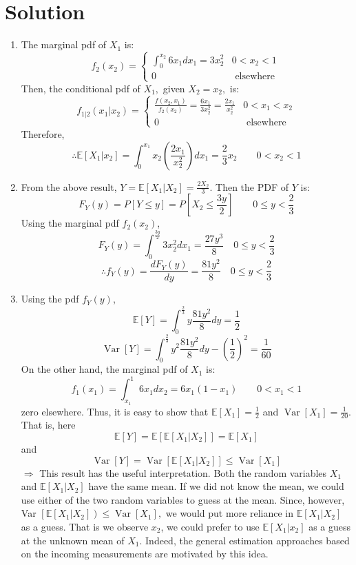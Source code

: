 \documentclass[10pt,a4paper,oneside]{article}
\begin{document}
\section* {Solution} 
\begin{enumerate}
\item The marginal pdf of $X_{1}$ is:
\[
f_{2}\left(x_{2}\right)=\left\{\begin{array}{ll}{\int_{0}^{x_{2}} 6 x_{1} d x_{1}=3 x_{2}^{2}} & {0<x_{2}<1} \\ {0} & {\text { elsewhere }}\end{array}\right.
\]
Then, the conditional pdf of $X_{1},$ given $X_{2}=x_{2},$ is:
\[
f_{1 | 2}\left(x_{1} | x_{2}\right)=\left\{\begin{array}{cc}{\frac{f\left(x_{2}, x_{1}\right)}{f_{2}\left(x_{2}\right)}=\frac{6 x_{1}}{3 x_{2}^{2}}=\frac{2 x_{1}}{x_{2}^{2}}} & {0<x_{1}<x_{2}} \\ {0} & {\text { elsewhere }}\end{array}\right.
\]
Therefore,
\[
\therefore \mathbb{E}\left[X_{1} | x_{2}\right]=\int_{0}^{x_{1}} x_{2}\left(\frac{2 x_{1}}{x_{2}^{2}}\right) d x_{1}=\frac{2}{3} x_{2} \qquad 0<x_{2}<1
\]
\item From the above result, $Y=\mathbb{E}\left[X_{1} | X_{2}\right]=\frac{2 X_{2}}{3} .$ Then the PDF of $Y$ is:
\[
F_{Y}(y)=P[Y \leq y]=P\left[X_{2} \leq \frac{3 y}{2}\right] \qquad 0 \leq y<\frac{2}{3}
\]
Using the marginal pdf $f_{2}\left(x_{2}\right)$,
\[
F_{Y}(y)=\int_{0}^{\frac{3 y}{2}} 3 x_{2}^{2} d x_{1}=\frac{27 y^{3}}{8} \quad 0 \leq y<\frac{2}{3}
\]
\[
\therefore f_{Y}(y)=\frac{d F_{Y}(y)}{d y}=\frac{81 y^{2}}{8} \quad 0 \leq y<\frac{2}{3}
\]
\item Using the pdf $f_Y(y)$,
\[
\mathbb{E}[Y]=\int_{0}^{\frac{2}{3}} y \frac{81 y^{2}}{8} d y=\frac{1}{2}
\]
\[
\operatorname{Var}[Y]=\int_{0}^{\frac{2}{3}} y^{2} \frac{81 y^{2}}{8} d y-\left(\frac{1}{2}\right)^{2}=\frac{1}{60}
\]
On the other hand, the marginal pdf of $X_{1}$ is:
\[
f_{1}\left(x_{1}\right)=\int_{x_{1}}^{1} 6 x_{1} d x_{2}=6 x_{1}\left(1-x_{1}\right) \qquad 0<x_{1}<1
\]
zero elsewhere. Thus, it is easy to show that $\mathbb{E}\left[X_{1}\right]=\frac{1}{2}$ and $\operatorname{Var}\left[X_{1}\right]=\frac{1}{20} .$ That is, here
\[
\mathbb{E}[Y]=\mathbb{E}\left[\mathbb{E}\left[X_{1} | X_{2}\right]\right]=\mathbb{E}\left[X_{1}\right]
\]
and
\[
\operatorname{Var}[Y]=\operatorname{Var}\left[\mathbb{E}\left[X_{1} | X_{2}\right]\right] \leq \operatorname{Var}\left[X_{1}\right]
\]
$\Rightarrow$ This result has the useful interpretation. Both the random variables $X_{1}$ and $\mathbb{E}\left[X_{1} | X_{2}\right]$ have the same mean. If we did not know the mean, we could use either of the two random variables to guess at the mean. Since, however, Var $\left[\mathbb{E}\left[X_{1} | X_{2}\right]\right) \leq \operatorname{Var}\left[X_{1}\right],$ we would put more reliance in $\mathbb{E}\left[X_{1} | X_{2}\right]$ as a guess. That is we observe $x_{2}$, we could prefer to use $\mathbb{E}\left[X_{1} | x_{2}\right]$ as a guess at the unknown mean of $X_{1}$. Indeed, the general estimation approaches based on the incoming measurements are motivated by this idea.
\end{enumerate}
\end{document}
